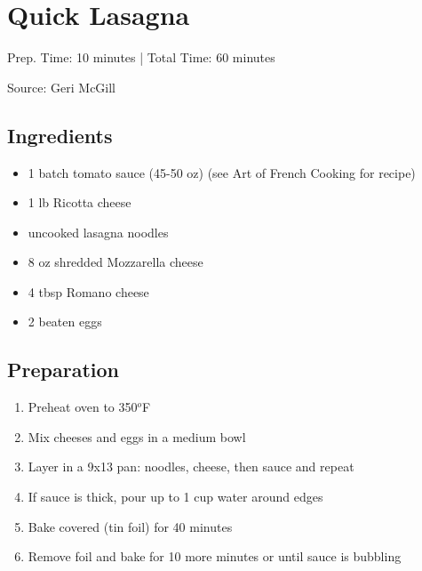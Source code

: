 \section{Quick Lasagna}

\begin{center}
Prep. Time: 10 minutes |
Total Time: 60 minutes

\vspace{1em}

Source: Geri McGill
\end{center}

\subsection{Ingredients}
\begin{multicols}{2}
\begin{itemize}
    \item 1 batch tomato sauce (45-50 oz) (see Art of French Cooking for recipe)
    \item 1 lb Ricotta cheese
    \item uncooked lasagna noodles
    \item 8 oz shredded Mozzarella cheese
    \item 4 tbsp Romano cheese
    \item 2 beaten eggs
\end{itemize}
\end{multicols}

\subsection{Preparation}
\begin{enumerate}
    \item Preheat oven to 350$^o$F
    \item Mix cheeses and eggs in a medium bowl
    \item Layer in a 9x13 pan: noodles, cheese, then sauce and repeat
    \item If sauce is thick, pour up to 1 cup water around edges
    \item Bake covered (tin foil) for 40 minutes
    \item Remove foil and bake for 10 more minutes or until sauce is bubbling
\end{enumerate}

